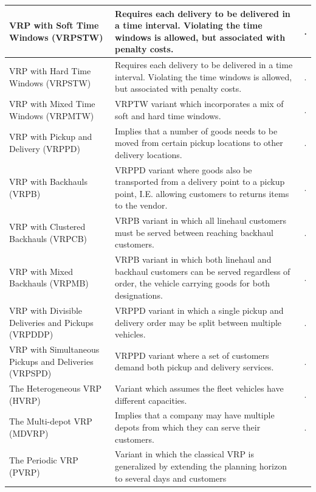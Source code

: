 \begin{longtable}[c]{|>{\raggedright}p{}|p{}|p{}|}
 VRP with Soft Time Windows (VRPSTW) & Requires each delivery to be delivered in a time interval. Violating the time windows is
allowed, but associated with penalty costs. & \cite{iqbal2015solving}.\\
 \hline
 VRP with Hard Time Windows (VRPSTW)  & Requires each delivery to be delivered in a time interval. Violating the time windows is
allowed, but associated with penalty costs. & \cite{miranda2016vehicle, zhang2017hybrid}.\\
 \hline
 VRP with Mixed Time Windows (VRPMTW)  & VRPTW variant which incorporates a  mix of soft and hard time windows. & \cite{mouthuy2015multistage}.\\
 \hline
 VRP with Pickup and Delivery (VRPPD)  & Implies that a number of goods needs
to be moved from certain pickup locations to other delivery locations. & \cite{parragh2006survey}.\\
 \hline
 VRP with Backhauls (VRPB)  & VRPPD variant where goods also be transported from a delivery point to a pickup point, I.E. allowing customers to returns items to the vendor. & \cite{dominguez2016biased}.\\
 \hline
 VRP with Clustered Backhauls (VRPCB)  & VRPB variant in which all linehaul customers must be served between reaching backhaul customers. & \cite{tarantilis2013adaptive}.\\
 \hline
 VRP with Mixed Backhauls (VRPMB) & VRPB variant in which both linehaul and backhaul customers can be served regardless of order, the vehicle carrying goods for both designations. & \cite{wu2016label}.\\
 \hline
 VRP with Divisible Deliveries and Pickups (VRPDDP)  & VRPPD variant in which a single pickup and delivery order may be split between multiple vehicles. & \cite{nagy2015vehicle}.\\
 \hline
 VRP with Simultaneous Pickups and Deliveries (VRPSPD)  & VRPPD variant where a set of customers demand both pickup and delivery services. & \cite{avci2016hybrid}.\\
 \hline
 The Heterogeneous VRP (HVRP) & Variant which assumes the fleet vehicles have different capacities. & \cite{lai2016tabu}.\\
 \hline
 The Multi-depot VRP (MDVRP)  & Implies that a company may have multiple depots from which they can serve their customers. & \cite{montoya2015literature}.\\
 \hline
 The Periodic VRP (PVRP)  & Variant in which the classical VRP is generalized
    by extending the planning horizon to several days and customers

\end{longtable}
